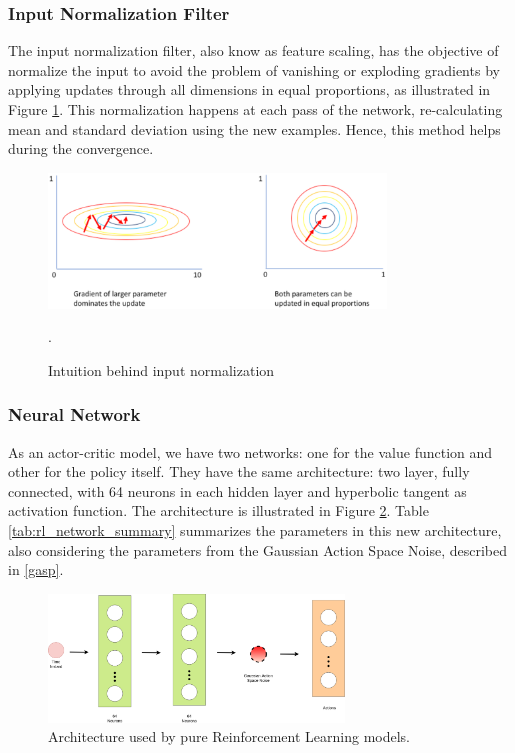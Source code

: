 \subsubsection{Input Normalization Filter}\label{sec:inputnorm}
The input normalization filter, also know as feature scaling, has the objective of normalize the input to avoid the problem of vanishing or exploding gradients by applying updates through all dimensions in equal proportions, as illustrated in Figure \ref{inputnormfig}. This normalization happens at each pass of the network, re-calculating mean and standard deviation using the new examples. Hence, this method helps during the convergence.

\begin{figure}[!htbp]
	\centering
	\includegraphics[width=0.8\textwidth]{Cap5/inputnorm.eps}
	\caption{Intuition behind input normalization \cite{inputnormalization}}.
	\label{inputnormfig}
\end{figure}

\subsubsection{Neural Network}
As an actor-critic model, we have two networks: one for the value function and other for the policy itself. They have the same architecture: two layer, fully connected, with 64 neurons in each hidden layer and hyperbolic tangent as activation function. The architecture is illustrated in Figure \ref{rlnetwork}. Table \ref{tab:rl_network_summary} summarizes the parameters in this new architecture, also considering the parameters from the Gaussian Action Space Noise, described in \ref{gasp}.

\begin{figure}[!htbp]
	\centering
	\includegraphics[width=0.7\textwidth]{Cap5/rlnetwork.eps}
	\caption{Architecture used by pure Reinforcement Learning models.}
	\label{rlnetwork}
\end{figure}

